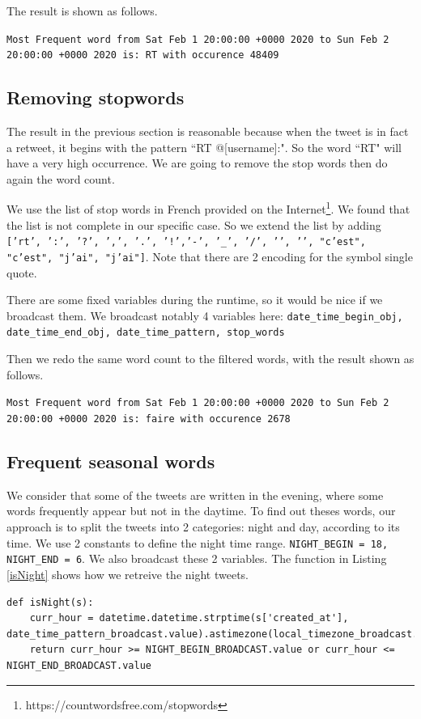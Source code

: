 The result is shown as follows.

\texttt{Most Frequent word from Sat Feb 1 20:00:00 +0000 2020 to Sun Feb 2 20:00:00 +0000 2020 is: RT with occurence 48409}


\subsection{Removing stopwords}
\label{mostFrequentWordsNoStop}
The result in the previous section is reasonable because when the tweet is in fact a retweet, it begins with the pattern ``RT @[username]:". So the word ``RT" will have a very high occurrence. We are going to remove the stop words then do again the word count.

We use the list of stop words in French provided on the Internet\footnote{https://countwordsfree.com/stopwords}. We found that the list is not complete in our specific case. So we extend the list by adding \texttt{['rt', ':', '?', ',', '.', '!','-', '\_', '/', '\guillemetleft', '\guillemetright', "c’est", "c'est", "j’ai", "j'ai"]}. Note that there are 2 encoding for the symbol single quote.

There are some fixed variables during the runtime, so it would be nice if we broadcast them. We broadcast notably 4 variables here: \texttt{date\_time\_begin\_obj, date\_time\_end\_obj, date\_time\_pattern, stop\_words}

Then we redo the same word count to the filtered words, with the result shown as follows.

\texttt{Most Frequent word from Sat Feb 1 20:00:00 +0000 2020 to Sun Feb 2 20:00:00 +0000 2020 is: faire with occurence 2678}

\subsection{Frequent seasonal words}
We consider that some of the tweets are written in the evening, where some words frequently appear but not in the daytime. To find out theses words, our approach is to split the tweets into 2 categories: night and day, according to its time. We use 2 constants to define the night time range. \texttt{NIGHT\_BEGIN = 18, NIGHT\_END = 6}. We also broadcast these 2 variables. The function in Listing \ref{isNight} shows how we retreive the night tweets.

\begin{minipage}{16cm}
\begin{lstlisting}[caption=Filter night tweets, label={isNight}]
def isNight(s):
    curr_hour = datetime.datetime.strptime(s['created_at'], date_time_pattern_broadcast.value).astimezone(local_timezone_broadcast.value).hour
    return curr_hour >= NIGHT_BEGIN_BROADCAST.value or curr_hour <= NIGHT_END_BROADCAST.value
\end{lstlisting}
\end{minipage}

